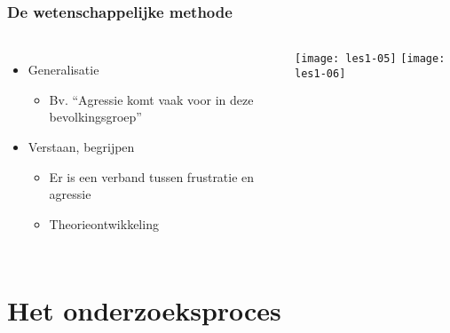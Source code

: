 \documentclass[aspectratio=169]{beamer}
\begin{document}
\begin{frame}
  \frametitle{De wetenschappelijke methode}
  
  \begin{columns}[c]
    
    \begin{itemize}
      \item Generalisatie
      \begin{itemize}
        \item Bv. ``Agressie komt vaak voor in deze bevolkingsgroep''
      \end{itemize}
      \item Verstaan, begrijpen
      \begin{itemize}
        \item Er is een verband tussen frustratie en agressie
        \item Theorieontwikkeling
      \end{itemize}
    \end{itemize}
    
    \texttt{[image: les1-05]}
    \vspace*{1cm}
    \texttt{[image: les1-06]}
    
  \end{columns}
\end{frame}

\section{Het onderzoeksproces}
\end{document}
